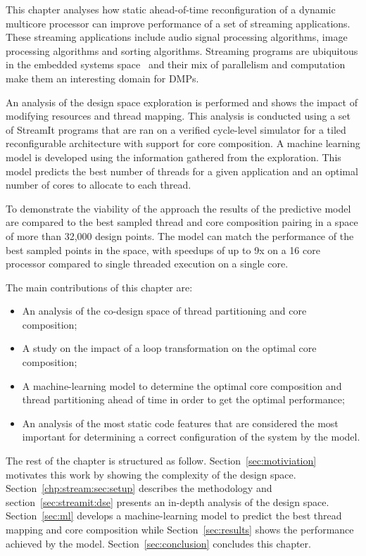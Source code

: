 This chapter analyses how static ahead-of-time reconfiguration of a dynamic multicore processor can improve performance of a set of streaming applications.
These streaming applications include audio signal processing algorithms, image processing algorithms and sorting algorithms.
Streaming programs are ubiquitous in the embedded systems space~\cite{theis2002streamit} and their mix of parallelism and computation make them an interesting domain for DMPs.

An analysis of the design space exploration is performed and shows the impact of modifying resources and thread mapping.
This analysis is conducted using a set of StreamIt programs that are ran on a verified cycle-level simulator for a tiled reconfigurable architecture with support for core composition.
A machine learning model is developed using the information gathered from the exploration.
This model predicts the best number of threads for a given application and an optimal number of cores to allocate to each thread.

To demonstrate the viability of the approach the results of the predictive model are compared to the best sampled thread and core composition pairing in a space of more than 32,000 design points.
The model can match the performance of the best sampled points in the space, with speedups of up to 9x on a 16 core processor compared to single threaded execution on a single core. 

The main contributions of this chapter are:
\begin{itemize}
\item An analysis of the co-design space of thread partitioning and core composition;
\vspace{-1em}
\item A study on the impact of a loop transformation on the optimal core composition;
\vspace{-1em}
\item A machine-learning model to determine the optimal core composition and thread partitioning ahead of time in order to get the optimal performance;
\vspace{-1em}
\item An analysis of the most static code features that are considered the most important for determining a correct configuration of the system by the model.
\end{itemize}


The rest of the chapter is structured as follow.
Section~\ref{sec:motiviation} motivates this work by showing the complexity of the design space.
Section~\ref{chp:stream:sec:setup} describes the methodology and section~\ref{sec:streamit:dse} presents an in-depth analysis of the design space.
Section~\ref{sec:ml} develops a machine-learning model to predict the best thread mapping and core composition while Section~\ref{sec:results} shows the performance achieved by the model.
Section~\ref{sec:conclusion} concludes this chapter.

